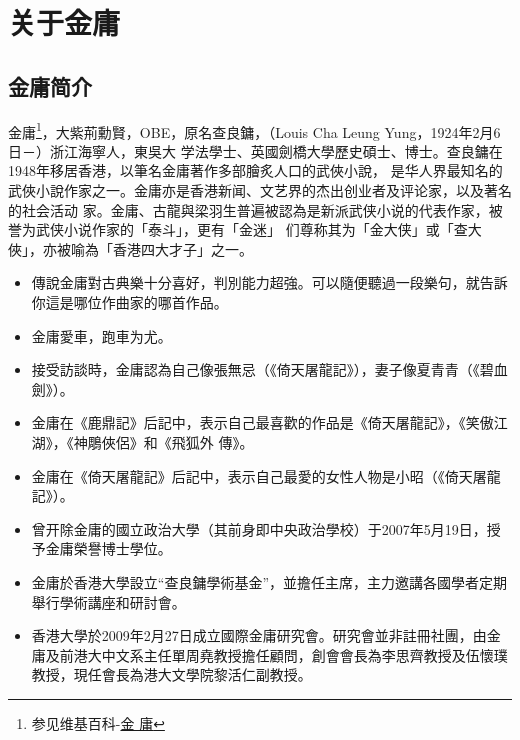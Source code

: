 \chapter{关于金庸}
\label{sec:appendixname}

\section{金庸简介}

金庸\footnote{参见维基百科-\href{http://zh.wikipedia.org/wiki/\%E9\%87\%91\%E5\%BA\%B8}{金
      庸}}，大紫荊勳賢，OBE，原名查良鏞，（Louis Cha Leung Yung，1924年2月6日－）浙江海寧人，東吳大
  学法學士、英國劍橋大學歷史碩士、博士。查良鏞在1948年移居香港，以筆名金庸著作多部膾炙人口的武俠小說，
  是华人界最知名的武俠小說作家之一。金庸亦是香港新闻、文艺界的杰出创业者及评论家，以及著名的社会活动
  家。金庸、古龍與梁羽生普遍被認為是新派武侠小说的代表作家，被誉为武侠小说作家的「泰斗」，更有「金迷」
  们尊称其为「金大侠」或「查大俠」，亦被喻為「香港四大才子」之一\Cite{jinyongcn}。
\begin{itemize}
\item 傳說金庸對古典樂十分喜好，判別能力超強。可以隨便聽過一段樂句，就告訴你這是哪位作曲家的哪首作品。
\item 金庸愛車，跑車为尤。
\item 接受訪談時，金庸認為自己像張無忌（《倚天屠龍記》），妻子像夏青青（《碧血劍》）。
\item 金庸在《鹿鼎記》后記中，表示自己最喜歡的作品是《倚天屠龍記》，《笑傲江湖》，《神鵰俠侶》和《飛狐外
  傳》。
\item 金庸在《倚天屠龍記》后記中，表示自己最愛的女性人物是小昭（《倚天屠龍記》）。
\item 曾开除金庸的國立政治大學（其前身即中央政治學校）于2007年5月19日，授予金庸榮譽博士學位。
\item 金庸於香港大學設立“查良鏞學術基金”，並擔任主席，主力邀講各國學者定期舉行學術講座和研討會。
\item 香港大學於2009年2月27日成立國際金庸研究會。研究會並非註冊社團，由金庸及前港大中文系主任單周堯教授擔任顧問，創會會長為李思齊教授及伍懷璞教授，現任會長為港大文學院黎活仁副教授\Cite{jinyongcn}。
\end{itemize}

